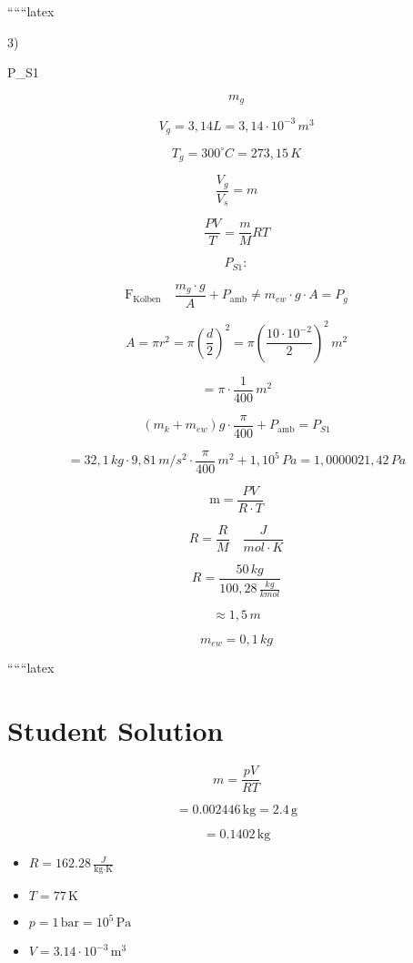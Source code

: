 
``````latex


3)

 P_{S1}

\[
m_g
\]

\[
V_{g} = 3,14L = 3,14 \cdot 10^{-3} \, m^3
\]

\[
T_{g} = 300^\circ C = 273,15 \, K
\]

\[
\frac{V_g}{V_s} = m
\]

\[
\frac{P V}{T} = \frac{m}{M} R T
\]

\[
P_{S1} :
\]

\[
\text{F}_{\text{Kolben}} \quad \frac{m_{g} \cdot g}{A} + P_{\text{amb}} \neq m_{ew} \cdot g \cdot A = P_{g}
\]

\[
A = \pi r^2 = \pi \left( \frac{d}{2} \right)^2 = \pi \left( \frac{10 \cdot 10^{-2}}{2} \right)^2 \, m^2
\]

\[
= \pi \cdot \frac{1}{400} \, m^2
\]

\[
(m_k + m_{ew}) g \cdot \frac{\pi}{400} + P_{\text{amb}} = P_{S1}
\]

\[
= 32,1 \, kg \cdot 9,81 \, m/s^2 \cdot \frac{\pi}{400} \, m^2 + 1,10^5 \, Pa = 1,0000021,42 \, Pa
\]

\[
\text{m} = \frac{P V}{R \cdot T}
\]

\[
R = \frac{R}{M} \quad \frac{J}{mol \cdot K}
\]

\[
R = \frac{50 \, kg}{100,28 \, \frac{kg}{kmol}}
\]

\[
\approx 1,5 \, m
\]

\[
m_{ew} = 0,1 \, kg
\]

``````latex


\section*{Student Solution}

\[
m = \frac{pV}{RT}
\]

\[
= 0.002446 \, \text{kg} = 2.4 \, \text{g}
\]

\[
= 0.1402 \, \text{kg}
\]

\begin{itemize}
    \item $R = 162.28 \, \frac{J}{\text{kg} \cdot \text{K}}$
    \item $T = 77 \, \text{K}$
    \item $p = 1 \, \text{bar} = 10^5 \, \text{Pa}$
    \item $V = 3.14 \cdot 10^{-3} \, \text{m}^3$
\end{itemize}

